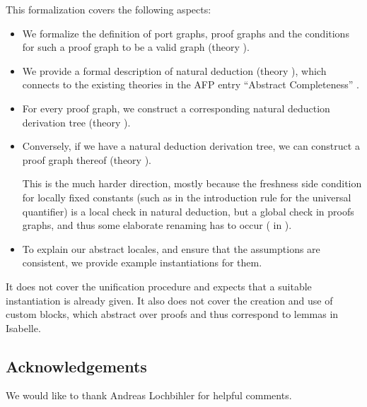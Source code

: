 \documentclass[11pt,DIV16,a4paper,parskip=half]{scrartcl}
\begin{document}
This formalization covers the following aspects:
\begin{itemize}
\item We formalize the definition of port graphs, proof graphs and the conditions for such a proof
      graph to be a valid graph (theory ).
\item We provide a formal description of natural deduction (theory ),
      which connects to the existing theories in the AFP entry “Abstract
      Completeness” \cite{Abstract_Completeness-AFP}.
\item For every proof graph, we construct a corresponding natural deduction derivation tree
      (theory  ).
\item Conversely, if we have a natural deduction derivation tree, we can construct a proof graph
      thereof (theory ).

      This is the much harder direction, mostly because the freshness side condition for locally
      fixed constants (such as in the introduction rule for the universal quantifier) is a local
      check in natural deduction, but a global check in proofs graphs, and thus some elaborate
      renaming has to occur ( in ).
\item To explain our abstract locales, and ensure that the assumptions are consistent, we provide
      example instantiations for them.
\end{itemize}

It does not cover the unification procedure and expects that a suitable instantiation is already
given. It also does not cover the creation and use of custom blocks, which abstract over proofs and thus correspond to lemmas in Isabelle.


\subsection*{Acknowledgements}

We would like to thank Andreas Lochbihler for helpful comments.




\clearpage
\newcommand{\theory}[1]{\subsection{#1}\label{sec\string_#1}}
\end{document}
